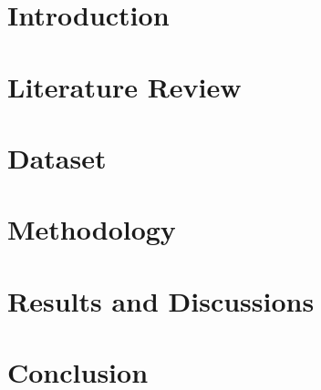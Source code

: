 \documentclass{cuetcsethesis}
\begin{document}

\maketitle

\certification







\thesisTables

\thesisBodyStart

\chapter{Introduction}
\label{chap:intro}


\chapter{Literature Review}
\label{chap:lr}


\chapter{Dataset}
\label{chap:dataset}


\chapter{Methodology}
\label{chap:method}


\chapter{Results and Discussions}
\label{chap:results}


\chapter{Conclusion}
\label{chap:conclusion}



\printReferences
\end{document}
